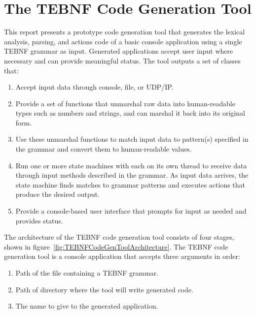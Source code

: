 \section{The TEBNF Code Generation Tool}
This report presents a prototype code generation tool that generates the lexical analysis, parsing, and actions code of a basic console application using a single TEBNF grammar as input.  Generated applications accept user input where necessary and can provide meaningful status.  The tool outputs a set of classes that:
\begin{enumerate}
  \item Accept input data through console, file, or UDP/IP.
  \item Provide a set of functions that unmarshal raw data into human-readable types such as numbers and strings, and can marshal it back into its original form.
  \item Use these unmarshal functions to match input data to pattern(s) specified in the grammar and convert them to human-readable values.
  \item Run one or more state machines with each on its own thread to receive data through input methods described in the grammar.  As input data arrives, the state machine finds matches to grammar patterns and executes actions that produce the desired output.
  \item Provide a console-based user interface that prompts for input as needed and provides status.
\end{enumerate}

\indent
The architecture of the TEBNF code generation tool consists of four stages, shown in figure~\ref{fig:TEBNFCodeGenToolArchitecture}.  The TEBNF code generation tool is a console application that accepts three arguments in order:
\begin{enumerate}
  \item Path of the file containing a TEBNF grammar.
  \item Path of directory where the tool will write generated code.
  \item The name to give to the generated application.
\end{enumerate}

